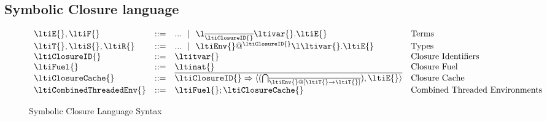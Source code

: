 \subsection{Symbolic Closure language}

\begin{figure}
$$
\begin{array}{lrll}
  \ltiE{}, \ltiF{} &::=& ... \alt
                         \ltiufunelab{\ova{\ltiufunelabentry{\ltiClosureID{}}}}
                                     {\ltivar{}}
                                     {\ltiE{}}
                      &\mbox{Terms} \\
  \ltiT{}, \ltiS{}, \ltiR{} &::=& ... \alt \ltiClosureWithStkID{\ltiEnv{}}{\ltiClosureID{}}{\ltiufun{\ltivar{}}{\ltiE{}}}
                      &\mbox{Types} \\
  \ltiClosureID{} &::=& \ltitvar{}
                      &\mbox{Closure Identifiers} \\
  \ltiFuel{} &::=& \ltinat{}
                      &\mbox{Closure Fuel} \\
  \ltiClosureCache{} &::=& \ova{\ltiClosureID{} \Rightarrow {\ltiClosureCacheVal{\ltiSplitIFn{}
                                                                                 {\ova{\ltiContextualFn{\ltiEnv{}}{\ltiT{}}{\ltiT{}}}}}
                                                                                {\ltiE{}}}}
                      &\mbox{Closure Cache} \\
  \ltiCombinedThreadedEnv{} &::=& \ltimakeCombinedThreadedEnv{\ltiFuel{}}{\ltiClosureCache{}}
                      &\mbox{Combined Threaded Environments} \\
\end{array}
$$
\caption{Symbolic Closure Language Syntax}
\label{symbolic:figure:SC-language-syntax}
\end{figure}


